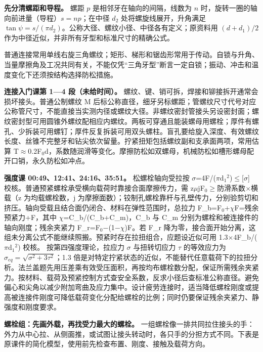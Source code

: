 \documentclass[zihao=5,a4paper,UTF8,fontset=fandol]{ctexart}
\begin{document}
\textbf{先分清螺距和导程。} 螺距 $p$ 是相邻牙在轴向的间隔，线数为 $n$ 时，旋转一圈的轴向前进量（导程）$s=np$；在中径 $d_2$ 处将螺旋线展开，升角满足 $\tan\psi=s/(\pi d_2)$。公称大径、螺纹小径、中径各有定义；原资料用 $(d+d_1)/2$ 作为中径近似，并非所有牙型和标准尺寸的精确公式。


普通连接常用单线右旋三角螺纹；矩形、梯形和锯齿形常用于传动。自锁与升角、当量摩擦角及工况共同有关，不能仅凭“三角牙型”断言一定自锁；振动、冲击和温度变化下还须按结构选择防松措施。


\textbf{连接入门课第 1—4 段（未给时间）。} 螺纹、键、销可拆，焊接和铆接拆开通常会损坏接头。普通公制螺纹 M 后标公称直径，细牙另标螺距；管螺纹尺寸代号对应公称管尺寸，不能直接当实测内径或螺纹大径。非螺纹密封管接头另设密封面；螺纹密封型可用圆锥外螺纹配相应内螺纹。两板可穿通且能装螺母用螺栓；厚件有螺孔、少拆装可用螺钉；厚件反复拆装可用双头螺柱。盲孔要给旋入深度、有效螺纹长度、丝锥不完整牙和钻尖依次留量。拧紧扭矩包括螺纹副和支承面两项，常用估算 T$\approx$0.2F$_{0}$d，系数随润滑等变化。摩擦防松如双螺母，机械防松如槽形螺母配开口销，永久防松如冲点。


\textbf{强度课 00:49、12:41、24:16、35:51。} 松螺栓轴向受拉按 $\sigma$=4F/($\pi$d$_{1}$$^{2}$)$\le$[$\sigma$] 校核。普通预紧螺栓承受横向载荷时靠接合面摩擦传力，需 z$\mu$jF$_{0}$$\ge$防滑系数$\times$横载（z 为均载螺栓数，j 为摩擦面数）；铰制孔螺栓靠杆与孔壁传力，分别验剪切和挤压。轴向受载且结合面仍闭合、材料在弹性范围时，总拉力 F\_b=F$_{0}$+$\chi$F=残余预紧力+F，其中 $\chi$=C\_b/(C\_b+C\_m)，C\_b 与 C\_m 分别为螺栓和被连接件的轴向刚度；残余夹紧力 F\_r=F$_{0}$$-$(1$-$$\chi$)F。若 F\_r 降为零，接合面开始分离，这组未分离公式不能继续照搬。预紧时存在拉扭组合，应题设近似可用 1.3$\times$4F\_b/($\pi$d$_{1}$$^{2}$) 校核。 按第四强度理论，拉应力 $\sigma$ 与扭转切应力 $\tau$ 的等效应力为 $\sigma_{eq}=\sqrt{\sigma^2+3\tau^2}$；1.3 倍是对特定拧紧状态的近似，不能替代任意载荷下的拉扭分析。法兰盖题先用压差乘有效受压面积，再按均布螺栓数分配，保证所需残余夹紧力。按材料、载荷及预紧控制方式查安全系数，反求小径后查标准公称直径。避免偏心和尖角以减少附加弯曲及应力集中。设计疲劳连接时，适当降低螺栓刚度或提高被连接件刚度可降低载荷变化分配给螺栓的比例；同时仍要保证残余夹紧力、静强度和刚度要求。


\textbf{螺栓组：先画外载，再找受力最大的螺栓。} 一组螺栓像一排共同拉住接头的手：外力从中心拉、从侧面推，或试图让接头转动时，各只手的分担方式不同。下表是原课件的简化模型，使用前先检查布置、刚度、接触及载荷方向。
\end{document}
